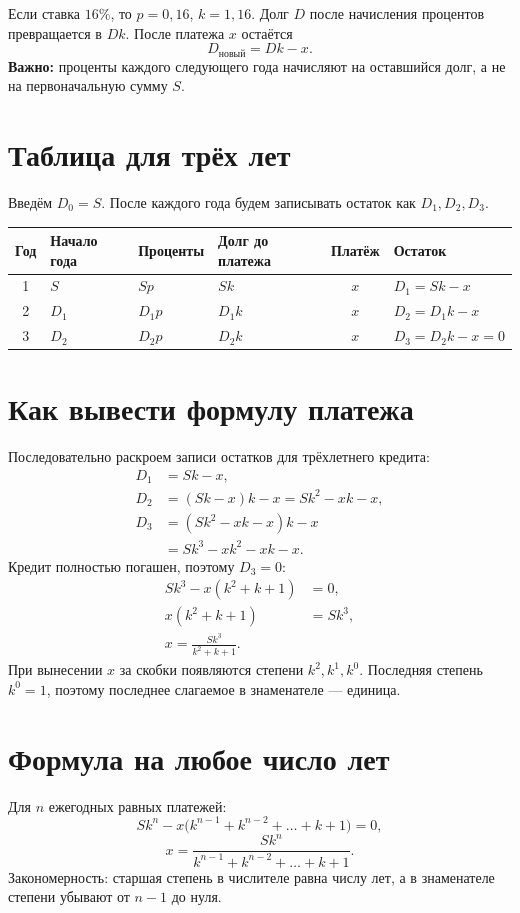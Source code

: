 \documentclass[a4paper,12pt]{article}
\newcommand{\focus}[1]{\textcolor{darkaccent}{#1}}
\begin{document}
Если ставка \(16\%\), то \(p=0{,}16\), \(k=1{,}16\). Долг \(D\) после начисления процентов превращается в \(Dk\). После платежа \(x\) остаётся
\[
\boxed{D_{\text{новый}}=Dk-x}.
\]
\textbf{Важно:} проценты каждого следующего года начисляют на оставшийся долг, а не на первоначальную сумму \(S\).

\section{Таблица для трёх лет}
Введём \(D_0=S\). После каждого года будем записывать остаток как \(D_1,D_2,D_3\).

\begingroup\small\renewcommand{\arraystretch}{1.45}
\begin{tabularx}{\linewidth}{@{}c>{\centering\arraybackslash}p{20mm}>{\centering\arraybackslash}p{22mm}>{\centering\arraybackslash}p{24mm}cX@{}}
\toprule
Год & Начало года & Проценты & Долг до платежа & Платёж & Остаток \\
\midrule
1 & \(S\) & \(Sp\) & \(Sk\) & \(x\) & \(D_1=Sk-x\) \\
2 & \(D_1\) & \(D_1p\) & \(D_1k\) & \(x\) & \(D_2=D_1k-x\) \\
3 & \(D_2\) & \(D_2p\) & \(D_2k\) & \(x\) & \(D_3=D_2k-x=0\) \\
\bottomrule
\end{tabularx}
\endgroup

\clearpage
\section{Как вывести формулу платежа}
Последовательно раскроем записи остатков для трёхлетнего кредита:
\begin{align*}
D_1&=Sk-x,\\
D_2&=(Sk-x)k-x=Sk^2-xk-x,\\
D_3&=(Sk^2-xk-x)k-x\\
   &=Sk^3-xk^2-xk-x.
\end{align*}
Кредит полностью погашен, поэтому \(D_3=0\):
\begin{align*}
Sk^3-x(k^2+k+1)&=0,\\
x(k^2+k+1)&=Sk^3,\\
\boxed{x=\frac{Sk^3}{k^2+k+1}}.&
\end{align*}
При вынесении \(x\) за скобки появляются степени \(k^2,k^1,k^0\). Последняя степень \(k^0=1\), поэтому последнее слагаемое в знаменателе --- единица.

\section{Формула на любое число лет}
Для \(n\) ежегодных равных платежей:
\[
\boxed{Sk^n-x\bigl(k^{n-1}+k^{n-2}+\ldots+k+1\bigr)=0},
\]
\[
\boxed{x=\frac{Sk^n}{k^{n-1}+k^{n-2}+\ldots+k+1}}.
\]
\focus{Закономерность:} старшая степень в числителе равна числу лет, а в знаменателе степени убывают от \(n-1\) до нуля.
\end{document}
